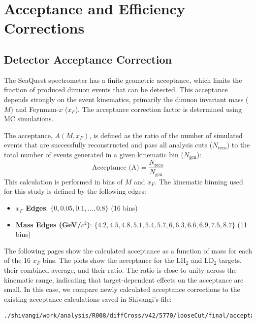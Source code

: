 \documentclass[11pt]{article}
\begin{document}
\section{Acceptance and Efficiency Corrections}
\label{sec:corrections}

\subsection{Detector Acceptance Correction}
The SeaQuest spectrometer has a finite geometric acceptance, which limits the fraction of produced dimuon events that can be detected. This acceptance depends strongly on the event kinematics, primarily the dimuon invariant mass ($M$) and Feynman-$x$ ($x_F$). The acceptance correction factor is determined using MC simulations.

The acceptance, $A(M, x_F)$, is defined as the ratio of the number of simulated events that are successfully reconstructed and pass all analysis cuts ($N_{\text{reco}}$) to the total number of events generated in a given kinematic bin ($N_{\text{gen}}$):
\begin{equation}
\text{Acceptance (A)} = \frac{N_{\text{reco}}}{N_{\text{gen}}}
\label{eq:acceptance}
\end{equation}
This calculation is performed in bins of $M$ and $x_F$. The kinematic binning used for this study is defined by the following edges:
\begin{itemize}
    \item \textbf{$x_F$ Edges}: $\{0, 0.05, 0.1, \dots, 0.8\}$ (16 bins)
    \item \textbf{Mass Edges (GeV/$c^2$)}: $\{4.2, 4.5, 4.8, 5.1, 5.4, 5.7, 6, 6.3, 6.6, 6.9, 7.5, 8.7\}$ (11 bins)
\end{itemize}

The following pages show the calculated acceptance as a function of mass for each of the 16 $x_F$ bins. The plots show the acceptance for the LH$_2$ and LD$_2$ targets, their combined average, and their ratio. The ratio is close to unity across the kinematic range, indicating that target-dependent effects on the acceptance are small. In this case, we compare newly calculated acceptance corrections to the existing acceptance calculations saved in Shivangi's file:
\begin{verbatim}
./shivangi/work/analysis/R008/diffCross/v42/5770/looseCut/final/acceptance_h.root
\end{verbatim}
\end{document}

